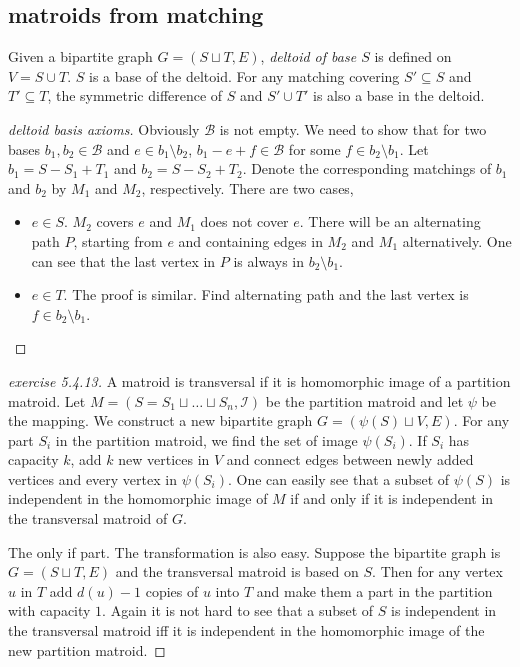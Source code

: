 \documentclass[12pt]{article}
\begin{document}
\subsection{matroids from matching}
Given a bipartite graph $G=(S\sqcup T, E)$, \emph{deltoid of base $S$} is defined on $V=S\cup T$. $S$ is a base of the deltoid. For any matching covering $S'\subseteq S$ and $T'\subseteq T$, the symmetric difference of $S$ and $S'\cup T'$ is also a base in the deltoid.
\begin{proof}[deltoid basis axioms]
    Obviously $\mathcal B$ is not empty. We need to show that for two bases $b_1,b_2\in \mathcal B$ and $e\in b_1\setminus b_2$, $b_1-e+f\in \mathcal{B}$ for some $f\in b_2\setminus b_1$. Let $b_1=S-S_1+T_1$ and $b_2=S-S_2+T_2$. Denote the corresponding matchings of $b_1$ and $b_2$ by $M_1$ and $M_2$, respectively. There are two cases,
    \begin{itemize}
        \item $e\in S$. $M_2$ covers $e$ and $M_1$ does not cover $e$. There will be an alternating path $P$, starting from $e$ and containing edges in $M_2$ and $M_1$ alternatively. One can see that the last vertex in $P$ is always in $b_2\setminus b_1$.
        \item $e\in T$. The proof is similar. Find alternating path and the last vertex is $f\in b_2\setminus b_1$.
    \end{itemize}
\end{proof}
\begin{proof}[exercise 5.4.13]
    A matroid is transversal if it is homomorphic image of a partition matroid. Let $M=(S=S_1\sqcup\ldots \sqcup S_n,\mathcal I)$ be the partition matroid and let $\psi$ be the mapping. We construct a new bipartite graph $G=(\psi(S)\sqcup V,E)$. For any part $S_i$ in the partition matroid, we find the set of image $\psi(S_i)$. If $S_i$ has capacity $k$, add $k$ new vertices in $V$ and connect edges between newly added vertices and every vertex in $\psi(S_i)$. One can easily see that a subset of $\psi(S)$ is independent in the homomorphic image of $M$ if and only if it is independent in the transversal matroid of $G$.

    The only if part. The transformation is also easy. Suppose the bipartite graph is $G=(S\sqcup T, E)$ and the transversal matroid is based on $S$. Then for any vertex $u$ in $T$ add $d(u)-1$ copies of $u$ into $T$ and make them a part in the partition with capacity $1$. Again it is not hard to see that a subset of $S$ is independent in the transversal matroid iff it is independent in the homomorphic image of the new partition matroid.
\end{proof}
\end{document}

